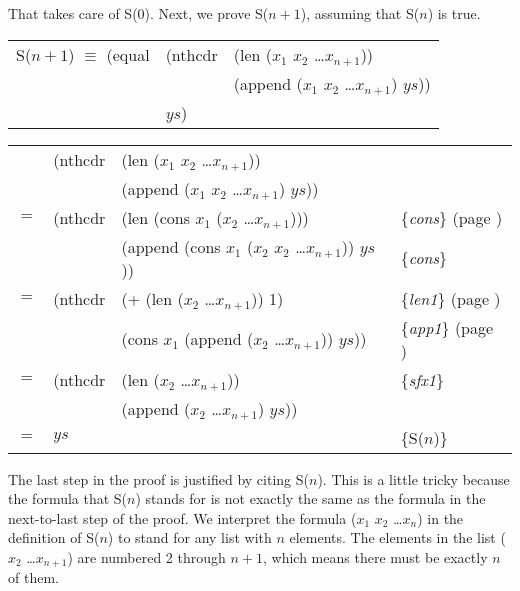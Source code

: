 That takes care of S(0). Next, we prove S($n+1$), assuming that S($n$) is true.

\begin{center}
\begin{tabular}{lll}
S($n+1$) $\equiv$ (equal & (nthcdr & (len ($x_1$ $x_2$ \dots $x_{n+1}$))          \\
                         &         & (append ($x_1$ $x_2$ \dots $x_{n+1}$) $ys$)) \\
                         & $ys$)   &                                              \\
\end{tabular}
\end{center}

\begin{center}
\begin{tabular}{llll}
    & (nthcdr & (len ($x_1$ $x_2$ \dots $x_{n+1}$))          & \\
    &         & (append ($x_1$ $x_2$ \dots $x_{n+1}$) $ys$)) & \\
$=$ & (nthcdr & (len (cons $x_1$ ($x_2$ \dots $x_{n+1}$)))          & \{\emph{cons}\} (page \pageref{cons-axiom-informal}) \\
    &         & (append (cons $x_1$ ($x_2$ $x_2$ \dots $x_{n+1}$)) $ys$)) & \{\emph{cons}\}                                    \\
$=$ & (nthcdr & (+ (len ($x_2$ \dots $x_{n+1}$)) 1)                 & \{\emph{len1}\} (page \pageref{len-equations})       \\
    &         & (cons $x_1$ (append ($x_2$ \dots $x_{n+1}$)) $ys$)) & \{\emph{app1}\} (page \pageref{append-equations})    \\
$=$ & (nthcdr & (len ($x_2$ \dots $x_{n+1}$))                       & \{\emph{sfx1}\}                                          \\
    &         & (append ($x_2$ \dots $x_{n+1}$) $ys$))              &                                                          \\
$=$ & $ys$    &                                                     & \{S($n$)\}                                              \\
\end{tabular}
\end{center}

The last step in the proof is justified by citing S($n$). This is a little tricky because the formula that S($n$) stands for is not exactly the same as the formula in the next-to-last step of the proof. We interpret the formula ($x_1$ $x_2$ \dots $x_n$) in the definition of S($n$) to stand for any list with $n$ elements. The elements in the list ($x_2$ \dots $x_{n+1}$) are numbered 2 through $n+1$, which means there must be exactly $n$ of them.

